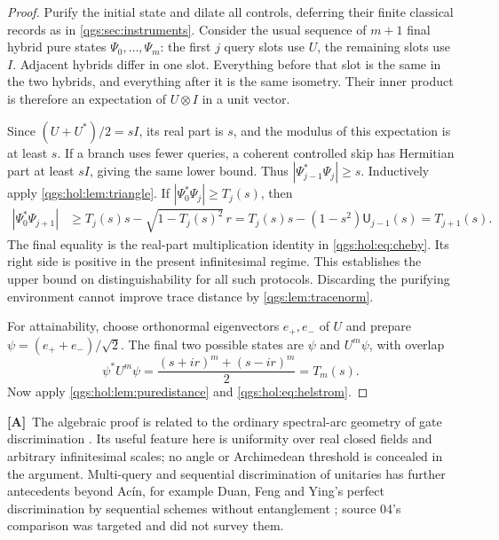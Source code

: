\documentclass[11pt,oneside]{article}
\numberwithin{equation}{section}
\theoremstyle{plain}
\theoremstyle{definition}
\theoremstyle{remark}
\newcommand{\abs}[1]{\left|#1\right|}
\newcommand{\TA}{\textcolor{TierA}{\textsf{\bfseries[A]}}}
\begin{document}
\begin{proof}
Purify the initial state and dilate all controls, deferring their finite classical records as in \cref{qgs:sec:instruments}. Consider the usual sequence of $m+1$ final hybrid pure states $\Psi_0,\ldots,\Psi_m$: the first $j$ query slots use $U$, the remaining slots use $I$. Adjacent hybrids differ in one slot. Everything before that slot is the same in the two hybrids, and everything after it is the same isometry. Their inner product is therefore an expectation of $U\otimes I$ in a unit vector.

Since $(U+U^*)/2=sI$, its real part is $s$, and the modulus of this expectation is at least $s$. If a branch uses fewer queries, a coherent controlled skip has Hermitian part at least $sI$, giving the same lower bound. Thus $\abs{\Psi_{j-1}^*\Psi_j}\geq s$. Inductively apply \cref{qgs:hol:lem:triangle}. If $\abs{\Psi_0^*\Psi_j}\geq T_j(s)$, then
\begin{align*}
 \abs{\Psi_0^*\Psi_{j+1}}
 &\geq T_j(s)s-\sqrt{1-T_j(s)^2}\,r
 =T_j(s)s-(1-s^2)\mathsf U_{j-1}(s)
 =T_{j+1}(s).
\end{align*}
The final equality is the real-part multiplication identity in \eqref{qgs:hol:eq:cheby}. Its right side is positive in the present infinitesimal regime. This establishes the upper bound on distinguishability for all such protocols. Discarding the purifying environment cannot improve trace distance by \cref{qgs:lem:tracenorm}.

For attainability, choose orthonormal eigenvectors $e_+,e_-$ of $U$ and prepare $\psi=(e_++e_-)/\sqrt2$. The final two possible states are $\psi$ and $U^m\psi$, with overlap
\[
 \psi^*U^m\psi=\frac{(s+ir)^m+(s-ir)^m}{2}=T_m(s).
\]
Now apply \cref{qgs:hol:lem:puredistance} and \eqref{qgs:hol:eq:helstrom}.
\end{proof}

\TA\ The algebraic proof is related to the ordinary spectral-arc geometry of gate discrimination \cite{Acin}. Its useful feature here is uniformity over real closed fields and arbitrary infinitesimal scales; no angle or Archimedean threshold is concealed in the argument. Multi-query and sequential discrimination of unitaries has further antecedents beyond Ac\'in, for example Duan, Feng and Ying's perfect discrimination by sequential schemes without entanglement \cite{DuanFengYing}; source 04's comparison was targeted and did not survey them.
\end{document}
